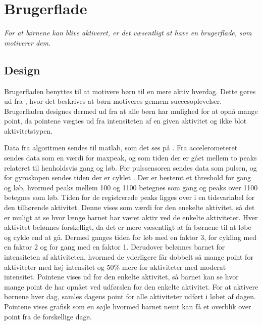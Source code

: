 \section{Brugerflade}
\textit{For at børnene kan blive aktiveret, er det væsentligt at have en brugerflade, som motiverer dem.}
\subsection{Design}
Brugerfladen benyttes til at motivere børn til en mere aktiv hverdag. Dette gøres ud fra , hvor det beskrives at børn motiveres gennem succesoplevelser. Brugerfladen designes dermed ud fra at alle børn har mulighed for at opnå mange point, da pointene vægtes ud fra intensiteten af en given aktivitet og ikke blot aktivitetstypen.

Data fra algoritmen sendes til matlab, som det ses på . Fra accelerometeret sendes data som en værdi for maxpeak, og som tiden der er gået mellem to peaks relateret til henholdsvis gang og løb. For pulssensoren sendes data som pulsen, og for gyroskopen sendes tiden der er cyklet . 
Der er bestemt et threshold for gang og løb, hvormed peaks mellem 100 og 1100 betegnes som gang og peaks over 1100 betegnes som løb. Tiden for de registrerede peaks ligges over i en tidsvariabel for den tilhørende aktivitet. Denne vises som værdi for den enekelte aktivitet, så det er muligt at se hvor længe barnet har været aktiv ved de enkelte aktiviteter. \newline
Hver aktivitet belønnes forskelligt, da det er mere væsentligt at få børnene til at løbe og cykle end at gå. Dermed ganges tiden for løb med en faktor 3, for cykling med en faktor 2 og for gang med en faktor 1. Derudover belønnes barnet for intensiteten af aktiviteten, hvormed de yderligere får dobbelt så mange point for aktiviteter med høj intensitet og 50\% mere for aktiviteter med moderat intensitet. Pointene vises ud for den enkelte aktivitet, så barnet kan se hvor mange point de har opnået ved udførslen for den enkelte aktivitet.\newline
For at aktivere børnene hver dag, samles dagens point for alle aktiviteter udført i løbet af dagen. Pointene vises grafisk som en søjle hvormed barnet nemt kan få et overblik over point fra de forskellige dage.

